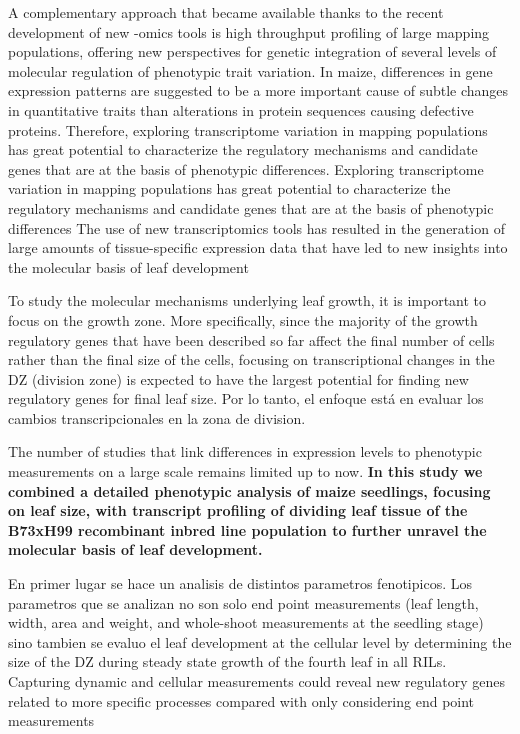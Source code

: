 \documentclass[a4paper,10pt]{article}
\begin{document}
A complementary approach that became available thanks to the recent development of new -omics tools is high throughput profiling of large mapping populations,
offering new perspectives for genetic integration of several levels of molecular regulation of phenotypic trait variation.
In maize, differences in gene expression patterns are suggested to be a more important cause of subtle changes in quantitative traits than alterations in protein sequences causing defective proteins.
Therefore, exploring transcriptome variation in mapping populations has great potential to characterize the regulatory mechanisms and candidate genes that are at the basis of phenotypic differences.
Exploring transcriptome variation in mapping populations has great potential to characterize the regulatory mechanisms and candidate genes that are at the basis of phenotypic differences
The use of new transcriptomics tools has resulted in the generation of large amounts of tissue-specific expression data that have led to new insights into the molecular basis of leaf development


To study the molecular mechanisms underlying leaf growth, it is important to focus on the growth zone.
More specifically, since the majority of the growth regulatory genes that have been described so far affect the final number of cells rather than the final size of the cells, focusing on transcriptional changes in the DZ (division zone) is
expected to have the largest potential for finding new regulatory genes for final leaf size.
Por lo tanto, el enfoque está en evaluar los cambios transcripcionales en la zona de division.

The number of studies that link differences in expression levels to phenotypic measurements on a large scale remains limited up to now.
\textbf{In this study we combined a detailed phenotypic analysis of maize seedlings, focusing on leaf size, with transcript profiling of dividing leaf tissue of the B73xH99 recombinant inbred line population to further unravel the molecular basis of leaf development.}

En primer lugar se hace un analisis de distintos parametros fenotipicos. 
Los parametros que se analizan no son solo end point measurements (leaf length, width, area and weight, and whole-shoot measurements at the seedling stage) sino tambien se evaluo el leaf development  
at the cellular level by determining the size of the DZ during steady state growth of the fourth leaf in all RILs.
Capturing dynamic and cellular measurements could reveal new regulatory genes related to more specific processes compared with only considering end point measurements
\end{document}
